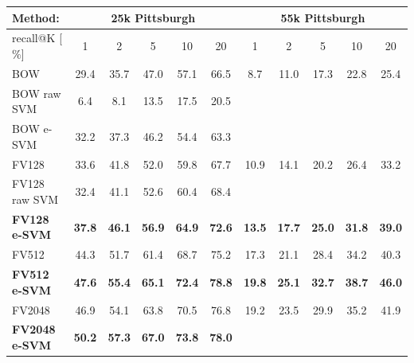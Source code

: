 \documentclass[10pt,twocolumn,letterpaper]{article}
\begin{document}
         \begin{table}[t!]
            \begin{centering}
               \begin{tabularx}{0.75\linewidth}{|l|c c c c c|c c c c c|}
                  \hline 
                  \rowcolor{maroon!50}
                  Method: & \multicolumn{5}{c|}{25k Pittsburgh} & \multicolumn{5}{c|}{55k Pittsburgh} \\
                  \hline 
                  \hline 
                  \rowcolor{maroon!50}
                  recall@K [$\%$] & 1 & 2 & 5 & 10 & 20 & 1 & 2 & 5 & 10 & 20\\
                  \hline
                  \rowcolor{maroon!10}
                  BOW         & 29.4 & 35.7 & 47.0 & 57.1 & 66.5 & 8.7 & 11.0 & 17.3 & 22.8 & 25.4  \\
                  BOW raw SVM & 6.4  &  8.1 & 13.5 & 17.5 & 20.5 & & & & & \\ 
                  BOW e-SVM   & 32.2 & 37.3 & 46.2 & 54.4 & 63.3 & & & & & \\
                    \hline
                  \rowcolor{maroon!10}
                  FV128         & 33.6 & 41.8 & 52.0 & 59.8 & 67.7 & 10.9 & 14.1 & 20.2 & 26.4 & 33.2 \\
                  FV128 raw SVM & 32.4 & 41.1 & 52.6 & 60.4 & 68.4 & & & & & \\
                  \rowcolor{maroon!10}
                  \textbf{FV128 e-SVM}   & \textbf{37.8}  & \textbf{46.1} & \textbf{56.9} & \textbf{64.9} & \textbf{72.6}  &
                                             \textbf{13.5}  &  \textbf{17.7}  &  \textbf{25.0}  &  \textbf{31.8}  &  \textbf{39.0} \\
                    \hline
                    \rowcolor{maroon!10}
                    FV512         & 44.3 & 51.7 & 61.4 & 68.7 & 75.2 & 17.3 &  21.1 &  28.4 &  34.2 &  40.3 \\
                    \rowcolor{maroon!10}
                    \textbf{FV512 e-SVM}   & \textbf{47.6}  & \textbf{55.4} & \textbf{65.1} & \textbf{72.4} & \textbf{78.8}  &
                                             \textbf{19.8} &  \textbf{25.1} &  \textbf{32.7}  & \textbf{38.7} &  \textbf{46.0} \\
                    \hline
                  \rowcolor{maroon!10}
                  FV2048        & 46.9  & 54.1 & 63.8 & 70.5 & 76.8 & 19.2 & 23.5 & 29.9 &  35.2 &  41.9 \\
                  \rowcolor{maroon!10}
                  \textbf{FV2048 e-SVM}  & \textbf{50.2} & \textbf{57.3} & \textbf{67.0} & \textbf{73.8} & \textbf{78.0} &

\end{tabularx}
\end{centering}
\end{table}
\end{document}
